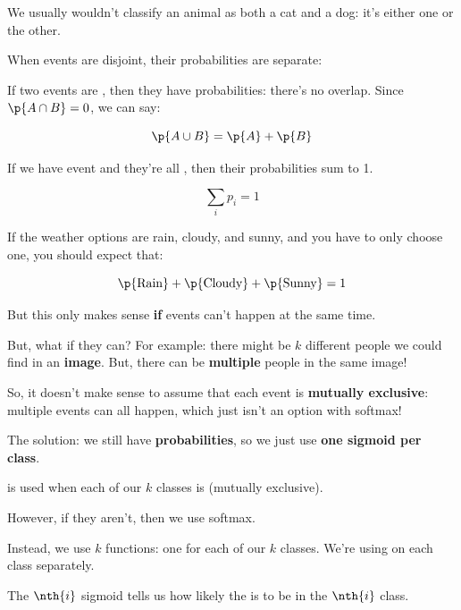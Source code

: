             \miniex We usually wouldn't classify an animal as both a cat and a dog: it's either one or the other.

            When events are disjoint, their probabilities are separate:\\

            \begin{concept}
                If two events are , then they have  probabilities: there's no overlap. Since $\p{A \cap B}=0$, we can say:

                \begin{equation*}
                    \p{A \cup B} = \p{A}+\p{B}
                \end{equation*}

                If we have  event and they're all , then their probabilities sum to 1.

                \begin{equation}
                    \sum_i p_i = 1
                \end{equation}
            \end{concept}

            \miniex If the weather options are rain, cloudy, and sunny, and you have to only choose one, you should expect that:

            \begin{equation}
                \p{\text{Rain}} + \p{\text{Cloudy}} + \p{\text{Sunny}} = 1
            \end{equation}

            But this only makes sense \textbf{if} events can't happen at the same time.

            But, what if they can? For example: there might be $k$ different people we could find in an \textbf{image}. But, there can be \textbf{multiple} people in the same image! 

            So, it doesn't make sense to assume that each event is \textbf{mutually exclusive}: multiple events can all happen, which just isn't an option with softmax!

            The solution: we still have \textbf{probabilities}, so we just use \textbf{one sigmoid per class}.\\

            \begin{clarification}
                 is used when each of our $k$ classes is  (mutually exclusive).

                However, if they aren't, then we  use softmax.

                Instead, we use $k$  functions: one for each of our $k$ classes. We're using  on each class separately.

                The $\nth{i}$ sigmoid tells us how likely the  is to be in the $\nth{i}$ class.
            \end{clarification}

